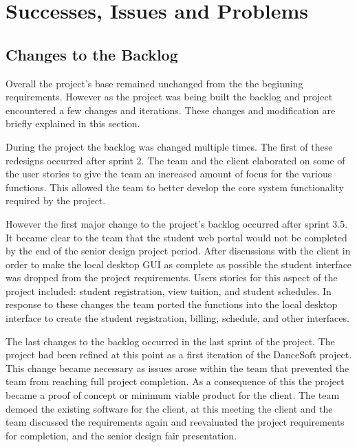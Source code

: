 \section{Successes, Issues and Problems}

\subsection{Changes to the Backlog}
Overall the project's base remained unchanged from the the beginning requirements. However as the project was being built the backlog and project encountered a few changes and iterations. These changes and modification are briefly explained in this section. 

During the project the backlog was changed multiple times. The first of these redesigns occurred after sprint 2. The team and the client elaborated on some of the user stories to give the team an increased amount of focus for the various functions. This allowed the team to better develop the core system functionality required by the project.

However the first major change to the project's backlog occurred after sprint 3.5. It became clear to the team that the student web portal would not be completed by the end of the senior design project period. After discussions with the client in order to make the local desktop GUI as complete as possible the student interface was dropped from the project requirements. Users stories for this aspect of the project included: student registration, view tuition, and student schedules. In response to these changes the team ported the functions into the local desktop interface to create the student registration, billing, schedule, and other interfaces.

The last changes to the backlog occurred in the last sprint of the project. The project had been refined at this point as a first iteration of the DanceSoft project. This change became necessary as issues arose within the team that prevented the team from reaching full project completion. As a consequence of this the project became a proof of concept or minimum viable product for the client. The team demoed the existing software for the client, at this meeting the client and the team discussed the requirements again and reevaluated the project requirements for completion, and the senior design fair presentation. 

